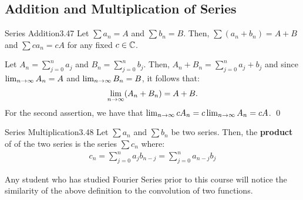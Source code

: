 \subsection{Addition and Multiplication of Series}
\setcounter{rudin}{46}
\begin{theorem}{Series Addition}{3.47}
    Let $\sum a_n = A$ and $\sum b_n = B$. Then, $\sum(a_n + b_n) = A + B$ and $\sum c a_n = cA$ for any fixed $c \in \mathbb{C}$.
\end{theorem}
\begin{nproof}
    Let $A_n = \sum_{j=0}^n a_j$ and $B_n = \sum_{j=0}^n b_j$. Then, $A_n + B_n = \sum_{j=0}^n a_j + b_j$ and since $\lim_{n \rightarrow \infty} A_n = A$ and $\lim_{n \rightarrow \infty} B_n = B$, it follows that:
    \begin{align*}
        \lim_{n \rightarrow \infty}(A_n + B_n) = A + B.
    \end{align*}
    For the second assertion, we have that $\lim_{n \rightarrow \infty} c A_n = c \lim_{n \rightarrow \infty} A_n = cA$. \qed
\end{nproof}

\begin{definition}{Series Multiplication}{3.48}
    Let $\sum a_n$ and $\sum b_n$ be two series. Then, the \textbf{product} of of the two series is the series $\sum c_n$ where:
    \begin{align*}
        c_n = \sum_{j=0}^n a_jb_{n-j} = \sum_{j=0}^n a_{n-j}b_j
    \end{align*}
\end{definition}
\noindent Any student who has studied Fourier Series prior to this course will notice the similarity of the above definition to the convolution of two functions.

